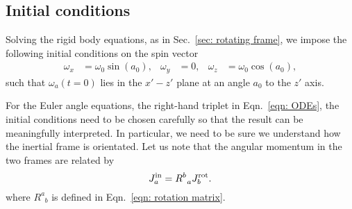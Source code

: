 \documentclass[../full_thesis/full_thesis.tex]{subfiles}
\begin{document}
\subsection{Initial conditions}
\label{sec: initial conditions}

Solving the rigid body equations, as in Sec.~\ref{sec:
rotating frame}, we impose the following initial conditions on the
spin vector
\begin{align}
\omega_{x} & = \omega_{0}\sin(a_{0}), &
\omega_{y} & = 0, &
\omega_{z} & = \omega_{0}\cos(a_{0}),
\label{eqn: spin init}
\end{align}
such that $\omega_a(t=0)$ lies in the $x' - z'$ plane at an angle $a_{0}$ to the
$z'$ axis.

For the Euler angle equations, the right-hand triplet in Eqn.~\eqref{eqn:
ODEs}, the initial conditions need to be chosen carefully so that the result
can be meaningfully interpreted. In particular, we need to be sure we understand
how the inertial frame is orientated. Let us note that the angular
momentum in the two frames are related by
\begin{equation}
J^{\textrm{in}}_a = R^{b}_{\;\;a} J^{\textrm{rot}}_b .
\label{eqn: transform}
\end{equation}
where $R^{a}_{\;\;b}$ is defined in Eqn.~\eqref{eqn: rotation matrix}.
\end{document}

